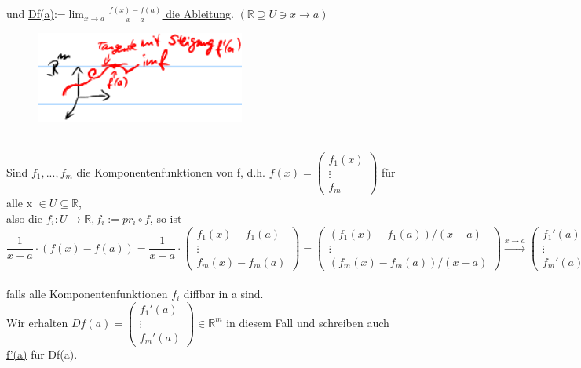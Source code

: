 \documentclass[]{scrartcl}
\begin{document}
	und  \ul{Df(a)}:=\ul{$\lim_{x\rightarrow a}\frac{f(x)-f(a)}{x-a}$ die Ableitung}. $(\mathbb{R}\supseteq U \ni x \rightarrow a)$\\
	\begin{figure}[h]
		\includegraphics[width=7 cm,height=3cm]{bsp kap 4.5}
	\end{figure}\\
	Sind $f_1,...,f_m$ die Komponentenfunktionen von f, d.h. $f(x)=\begin{pmatrix}
		f_1(x)\\ \vdots \\f_m
	\end{pmatrix}$ für alle x $\in$\underline{$U\subseteq\mathbb{R}$},\\
	also die $f_i:U\rightarrow\mathbb{R}, f_i:=pr_i \circ f$, so ist\\
	\begin{equation}
		\frac{1}{x-a}\cdot(f(x)-f(a))=\frac{1}{x-a}\cdot\begin{pmatrix}
			f_1(x)-f_1(a)\\ \vdots \\ f_m(x)-f_m(a)
		\end{pmatrix}=\begin{pmatrix}
		(f_1(x)-f_1(a))/(x-a)\\ \vdots \\ (f_m(x)-f_m(a))/(x-a)
	\end{pmatrix} \xrightarrow{x\rightarrow a}\begin{pmatrix}
		f_1'(a)\\ \vdots \\ f_m'(a)
		\end{pmatrix},
	\end{equation}\\
	falls alle Komponentenfunktionen $f_i$ diffbar in a sind.\\
	Wir erhalten $Df(a)=\begin{pmatrix}
		f_1'(a)\\ \vdots \\f_m'(a)
	\end{pmatrix} \in \mathbb{R}^m$ in diesem Fall und schreiben auch  \ul{f'(a)} für Df(a).\\
\end{document}
